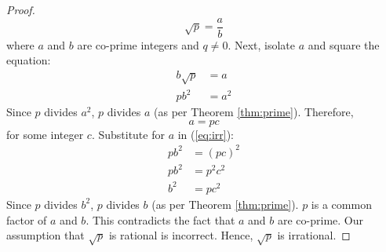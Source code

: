 \begin{outline}
\begin{proof}
        $$\sqrt{p} = \frac{a}{b}$$
        where $a$ and $b$ are co-prime integers and $q \ne 0$. Next, isolate $a$ and square the equation:
        \begin{align}
            b\sqrt{p} &= a \\
            pb^2 &= a^2 \label{eq:irr}
        \end{align}
        Since $p$ divides $a^2$, $p$ divides $a$ (as per Theorem \ref{thm:prime}). Therefore,
        $$a = pc$$
        for some integer $c$. Substitute for $a$ in (\ref{eq:irr}):
        \begin{align*}
            pb^2 &= (pc)^2 \\
            pb^2 &= p^2c^2 \\
            b^2 &= pc^2
        \end{align*}
        Since $p$ divides $b^2$, $p$ divides $b$ (as per Theorem \ref{thm:prime}). $p$ is a common factor of $a$ and $b$. This contradicts the fact that $a$ and $b$ are co-prime. Our assumption that $\sqrt{p}$ is rational is incorrect. Hence, $\sqrt{p}$ is irrational.
    \end{proof}
\end{outline}
